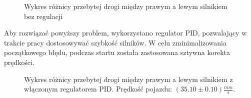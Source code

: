             \begin{figure}[!ht]
                \centering
                \caption{Wykres różnicy przebytej drogi między prawym a lewym silnikiem bez regulacji}
                \label{plot:distance_err_in_time_const_speed}
            \end{figure}

            Aby rozwiązać powyższy problem, wykorzystano regulator PID, pozwalający w trakcie pracy dostosowywać szybkość silników.
            W celu zminimalizowania początkowego błędu, podczas startu została zastosowana sztywna korekta prędkości.
            \begin{figure}[!ht]
                \centering
                \caption{Wykres różnicy przebytej drogi między prawym a lewym silnikiem z włączonym regulatorem PID. Prędkość pojazdu: $(35.10 \pm 0.10)\frac{mm}{s}$.}
                \label{plot:PID_distance_err_in_time}
            \end{figure}

